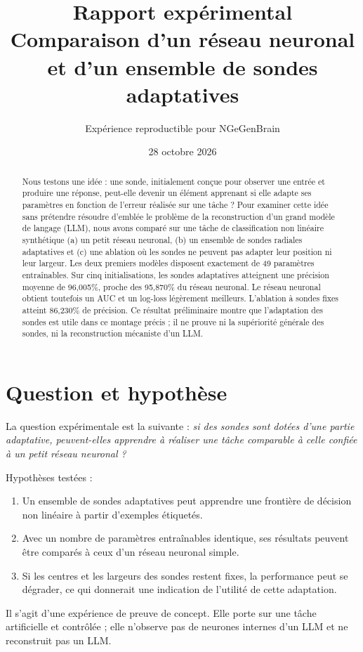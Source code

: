 \documentclass[11pt,a4paper]{article}
\title{\vspace{-1.0cm}\color{bleu}\bfseries Rapport expérimental\\[0.3em]\Large Comparaison d'un réseau neuronal et d'un ensemble de sondes adaptatives}
\author{Expérience reproductible pour NGeGenBrain}
\date{28 octobre 2026}
\begin{document}
\maketitle
\begin{abstract}
Nous testons une idée : une sonde, initialement conçue pour observer une entrée et produire une réponse, peut-elle devenir un élément apprenant si elle adapte ses paramètres en fonction de l'erreur réalisée sur une tâche ? Pour examiner cette idée sans prétendre résoudre d'emblée le problème de la reconstruction d'un grand modèle de langage (LLM), nous avons comparé sur une tâche de classification non linéaire synthétique (a) un petit réseau neuronal, (b) un ensemble de sondes radiales adaptatives et (c) une ablation où les sondes ne peuvent pas adapter leur position ni leur largeur. Les deux premiers modèles disposent exactement de 49 paramètres entraînables. Sur cinq initialisations, les sondes adaptatives atteignent une précision moyenne de 96,005\%, proche des 95,870\% du réseau neuronal. Le réseau neuronal obtient toutefois un AUC et un log-loss légèrement meilleurs. L'ablation à sondes fixes atteint 86,230\% de précision. Ce résultat préliminaire montre que l'adaptation des sondes est utile dans ce montage précis ; il ne prouve ni la supériorité générale des sondes, ni la reconstruction mécaniste d'un LLM.
\end{abstract}

\section{Question et hypothèse}
La question expérimentale est la suivante : \emph{si des sondes sont dotées d'une partie adaptative, peuvent-elles apprendre à réaliser une tâche comparable à celle confiée à un petit réseau neuronal ?}

Hypothèses testées :
\begin{enumerate}[leftmargin=1.5em]
  \item Un ensemble de sondes adaptatives peut apprendre une frontière de décision non linéaire à partir d'exemples étiquetés.
  \item Avec un nombre de paramètres entraînables identique, ses résultats peuvent être comparés à ceux d'un réseau neuronal simple.
  \item Si les centres et les largeurs des sondes restent fixes, la performance peut se dégrader, ce qui donnerait une indication de l'utilité de cette adaptation.
\end{enumerate}
Il s'agit d'une expérience de preuve de concept. Elle porte sur une tâche artificielle et contrôlée ; elle n'observe pas de neurones internes d'un LLM et ne reconstruit pas un LLM.
\end{document}
